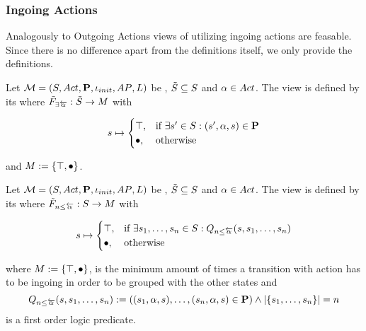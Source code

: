 \documentclass[preview]{standalone}
\begin{document}
\subsubsection{Ingoing Actions}
Analogously to Outgoing Actions views of utilizing ingoing actions are feasable. Since there is no difference apart from the definitions itself, we only provide the definitions.

\begin{definition}
	Let ${{{\mathcal{M}}}} = {{({S}, {Act}, {\textbf{P}}, {\iota_{init}}, {AP}, {L})}}$ be \achgphN, ${\tilde{{S}}} \subseteq {S}$ and ${\alpha} \in {Act}$. The view \viewhasinaction is defined by its \grpfctN where ${{\tilde{F}_{{\exists{\overleftarrow{\ensuremath{{\alpha}}}}}}}} : {\tilde{{S}}} \to {\ensuremath{{M}}}$ with 
	
	\[
	{s} \mapsto
	\begin{cases}
			{\top},				& \text{if } \exists {s}' \in {S}: ({s}', {\alpha}, {s}) \in {\ensuremath{{\textbf{P}}}} \\
			{\bullet},          	& \text{otherwise}
		\end{cases}
	\]
	
	and ${{M}} := {\{{\top}, {\bullet}\}}$.	
	\label{def:mininaction}
\end{definition}	


\begin{definition}
	Let ${{{\mathcal{M}}}} = {{({S}, {Act}, {\textbf{P}}, {\iota_{init}}, {AP}, {L})}}$ be \achgphN, ${\tilde{{S}}} \subseteq {S}$ and ${\alpha} \in {Act}$. The view \viewmininaction is defined by its \grpfctN where ${{\tilde{F}_{{{n}\leq{\overleftarrow{\ensuremath{{\alpha}}}}}}}} : {S} \to {M}$ with
	
	\[
	{s} \mapsto
	\begin{cases}
			{\top},				& \text{if } \exists {s}_1, \dots, {s}_{n} \in {S}:  {Q_{{n}\leq{\overleftarrow{\ensuremath{{\alpha}}}}}({s},{s}_1, \dots, {s}_{{n}})}\\
			{\bullet},          	& \text{otherwise}
		\end{cases}
	\]
	
	where ${{M}} := {\{{\top}, {\bullet}\}}$,
	 is the minimum amount of times a transition with action \action has to be ingoing in order to be grouped with the other states and
	\[
	{Q_{{n}\leq{\overleftarrow{\ensuremath{{\alpha}}}}}({s},{s}_1, \dots, {s}_{{n}})} := (({s}_1, {\alpha}, {s}), \dots, ({s}_{n}, {\alpha}, {s}) \in {\ensuremath{{\textbf{P}}}}) \land |\{{s}_1, \dots, {s}_{n}\}| = {n}
	\]
	is a first order logic predicate.
	\label{def:viewmaxinaction}
\end{definition}
\end{document}
